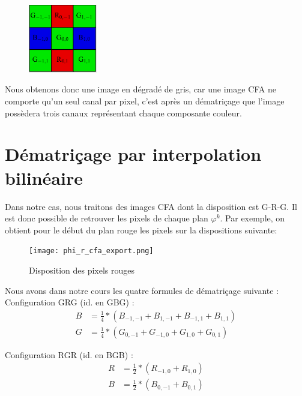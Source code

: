 \documentclass[a4paper,11pt]{article}
\begin{document}
  \begin{figure}[H]
  \center
   \includegraphics[width=3cm]{bayerBGB.png}
  \end{figure}
  
  Nous obtenons donc une image en dégradé de gris, car une image CFA ne comporte qu'un seul canal par pixel,
  c'est après un dématriçage que l'image possèdera trois canaux représentant chaque composante couleur.
  
  \section{Dématriçage par interpolation bilinéaire}
  
  Dans notre cas, nous traitons des images CFA dont la disposition est G-R-G. Il est donc possible de 
  retrouver les pixels de chaque plan $\varphi^k$. Par exemple, on obtient pour le début du plan rouge 
  les pixels sur la dispositions suivante:
  
  \begin{figure}[H]
   \center
   \texttt{[image: phi\_r\_cfa\_export.png]}
   \caption{Disposition des pixels rouges}
  \end{figure}
  
  Nous avons dans notre cours les quatre formules de dématriçage suivante :\\
  
  Configuration {GRG} (id. en {GBG}) :\\
  \begin{align}
  B &= \frac{1}{4} * (B_{-1,-1}+B_{1,-1}+B_{-1,1}+B_{1,1})\\
  G &= \frac{1}{4} * (G_{0,-1}+G_{-1,0}+G_{1,0}+G_{0,1})
  \end{align}
  
  Configuration {RGR} (id. en {BGB}) :\\
  \begin{align}
  R &= \frac{1}{2} * (R_{-1,0}+R_{1,0})\\
  B &= \frac{1}{2} * (B_{0,-1}+B_{0,1})
  \end{align}
  
\end{document}
